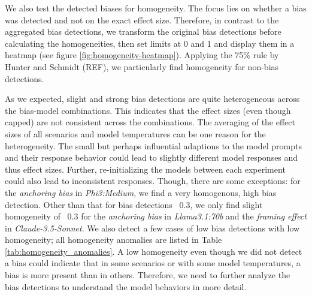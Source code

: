 \par We also test the detected biases for homogeneity. The focus lies on whether a bias was detected and not on the exact effect size. Therefore, in contrast to the aggregated bias detections, we transform the original bias detections before calculating the homogeneities, then set limits at 0 and 1 and display them in a heatmap (see figure \ref{fig:homogeneity-heatmap}). Applying the 75\% rule by Hunter and Schmidt (REF), we particularly find homogeneity for non-bias detections.

\par As we expected, slight and strong bias detections are quite heterogeneous across the bias-model combinations. This indicates that the effect sizes (even though capped) are not consistent across the combinations. The averaging of the effect sizes of all scenarios and model temperatures can be one reason for the heterogeneity. The small but perhaps influential adaptions to the model prompts and their response behavior could lead to slightly different model responses and thus effect sizes. Further, re-initializing the models between each experiment could also lead to inconsistent responses. Though, there are some exceptions: for the \textit{anchoring bias} in \textit{Phi3:Medium}, we find a very homogenous, high bias detection. Other than that for bias detections \geq\, 0.3, we only find slight homogeneity of \geq\, 0.3 for the \textit{anchoring bias} in \textit{Llama3.1:70b} and the \textit{framing effect} in \textit{Claude-3.5-Sonnet}. We also detect a few cases of low bias detections with low homogeneity; all homogeneity anomalies are listed in Table \ref{tab:homogeneity_anomalies}. A low homogeneity even though we did not detect a bias could indicate that in some scenarios or with some model temperatures, a bias is more present than in others. Therefore, we need to further analyze the bias detections to understand the model behaviors in more detail.

